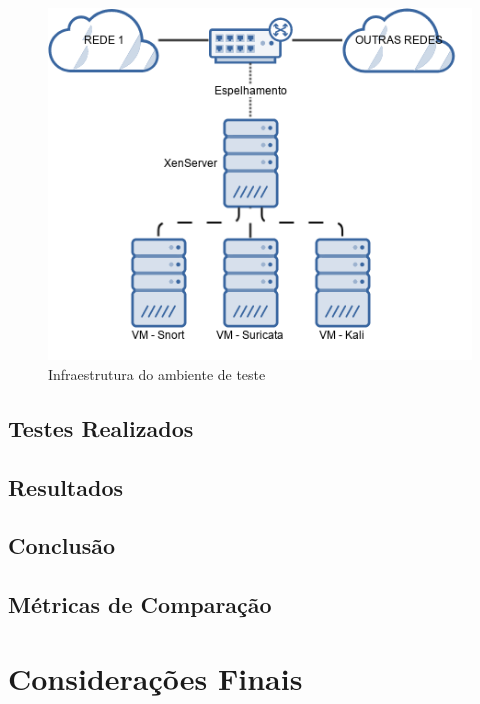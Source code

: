 \documentclass[
	12pt,				
	openright,		
	twoside,	
	a4paper,
	english,	
	brazil	
	]{abntex2}
\begin{document}
\begin{figure}[!htp]
 \centering
 \includegraphics[scale=.6]{infra.png}
 \caption{Infraestrutura do ambiente de teste}
 \label{fig:infra-ambiente}
\end{figure}

\section{Testes Realizados} \label{sec:testes}
\section{Resultados} \label{sec:resultados}
\section{Conclusão} \label{sec:conclusão}
\section{Métricas de Comparação}
\chapter{Considerações Finais} \label{considerações}
\postextual

\printindex
\end{document}
